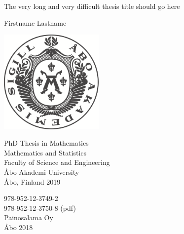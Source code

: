 

\thispagestyle{empty}

\begin{center}
    \Huge
    
    \noindent The very long and very difficult thesis title should go here
    
    \vfill
    \vfill
    
    \LARGE
    \noindent Firstname Lastname
    
    \vfill
    \vfill
    
    \includegraphics[width=0.38\textwidth]{sigill.png}
    
    \vfill
    
    \large
    
    \noindent
    PhD Thesis in Mathematics\\
    Mathematics and Statistics\\
    Faculty of Science and Engineering\\
    {\AA}bo Akademi University\\
    \vfill
    {\AA}bo, Finland 2019

\end{center}


\clearpage
\thispagestyle{empty}

\null\vfill

\begin{center}
   
	978-952-12-3749-2 \\
    978-952-12-3750-8 (pdf)\\
	\vspace{5mm}
	Painosalama Oy\\
	{\AA}bo 2018
\end{center}

